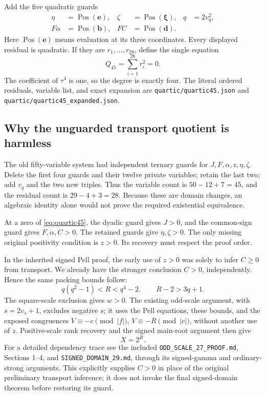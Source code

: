 Add the five quadratic guards
\begin{align*}
 \eta&=\operatorname{Pos}(\boldsymbol e),&
 \zeta&=\operatorname{Pos}(\boldsymbol\xi),&
 q&=2v_q^2,\\
 F\alpha&=\operatorname{Pos}(\boldsymbol b),&
 FC&=\operatorname{Pos}(\boldsymbol d).
\end{align*}
Here \(\operatorname{Pos}(\boldsymbol e)\) means evaluation at its three
coordinates.  Every displayed residual is quadratic.  If they are
\(r_1,\ldots,r_{28}\), define the single equation
\begin{equation}
 \boxed{\displaystyle Q_{45}=\sum_{i=1}^{28}r_i^2=0.}
 \label{eq:quartic45}
\end{equation}
The coefficient of \(\tau^4\) is one, so the degree is exactly four.
The literal ordered residuals, variable list, and exact expansion are
\texttt{quartic/quartic45.json} and
\texttt{quartic/quartic45\_expanded.json}.

\subsection{Why the unguarded transport quotient is harmless}

The old fifty-variable system had independent ternary guards for
\(J,F,\alpha,z,\eta,\zeta\).  Delete the first four guards and their
twelve private variables; retain the last two; add \(v_q\) and the two
new triples.  Thus the variable count is
\(50-12+7=45\), and the residual count is \(29-4+3=28\).
Because these are domain changes, an algebraic identity alone would not
prove the required existential equivalence.

At a zero of \eqref{eq:quartic45}, the dyadic guard gives \(J>0\),
and the common-sign guard gives \(F,\alpha,C>0\).  The retained
guards give \(\eta,\zeta>0\).  The only missing original positivity
condition is \(z>0\).  Its recovery must respect the proof order.

In the inherited signed Pell proof, the early use of \(z>0\) was
solely to infer \(C\ge0\) from transport.  We already have the stronger
conclusion \(C>0\), independently.  Hence the same packing bounds follow:
\[
 q(q^2-1)<R<q^4-2,\qquad R-2>3q+1.
\]
The square-scale exclusion gives \(w>0\).  The existing odd-scale
argument, with \(s=2v_s+1\), excludes negative \(s\); it uses the
Pell equations, these bounds, and the exposed congruences
\(V\equiv-c\pmod{|f|}\), \(V\equiv-R\pmod{|c|}\), without
another use of \(z\).  Positive-scale rank recovery and the signed
main-root argument then give
\[
 X=2^R.
\]
For a detailed dependency trace see the included
\texttt{ODD\_SCALE\_27\_PROOF.md}, Sections 1--4, and
\texttt{SIGNED\_DOMAIN\_29.md}, through its signed-gamma and
ordinary-strong arguments.  This explicitly supplies \(C>0\) in place
of the original preliminary transport inference; it does not invoke
the final signed-domain theorem before restoring its guard.


